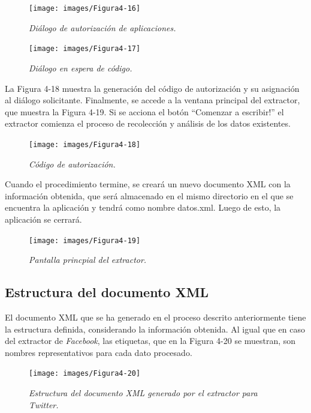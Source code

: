 \begin{figure}[H]
	\centering
	\texttt{[image: images/Figura4-16]}
	\caption{\em Diálogo de autorización de aplicaciones.}
	\label{fig:ext-im16}
\end{figure}

\begin{figure}[H]
	\centering
	\texttt{[image: images/Figura4-17]}
	\caption{\em Diálogo en espera de código.}
	\label{fig:ext-im17}
\end{figure}


La Figura 4-18 muestra la generación del código de autorización y su asignación al diálogo solicitante. Finalmente, se accede a la ventana principal del extractor, que muestra la Figura 4-19. Si se acciona el botón “Comenzar a escribir!” el extractor comienza el proceso de recolección y análisis de los datos existentes. 

\begin{figure}[H]
	\centering
	\texttt{[image: images/Figura4-18]}
	\caption{\em Código de autorización.}
	\label{fig:ext-im18}
\end{figure}

Cuando el procedimiento termine, se creará un nuevo documento XML con la información obtenida, que será almacenado en el mismo directorio en el que se encuentra la aplicación y tendrá como nombre datos.xml. Luego de esto, la aplicación se cerrará.

\begin{figure}[H]
	\centering
	\texttt{[image: images/Figura4-19]}
	\caption{\em Pantalla princpial del extractor.}
	\label{fig:ext-im19}
\end{figure}

\subsection{Estructura del documento XML}

El documento XML que se ha generado en el proceso descrito anteriormente tiene la estructura definida, considerando la información obtenida. Al igual que en caso del extractor de \textit{Facebook}, las etiquetas, que en la Figura 4-20 se muestran, son nombres representativos para cada dato procesado.

\begin{figure}[H]
	\centering
	\texttt{[image: images/Figura4-20]}
	\caption{\em Estructura del documento XML generado por el extractor para Twitter.}
	\label{fig:ext-im20}
\end{figure}


